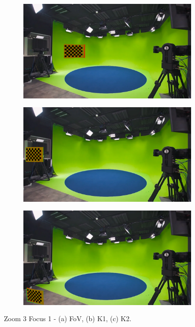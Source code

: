 \begin{figure}[h]
    \centering
    \begin{subfigure}[b]{0.45\textwidth}
        \includegraphics[width=\textwidth]{Images/08annex/results/5.2.png}
        \caption{}
        \label{fig:a2}
    \end{subfigure}
    \hfill
    \begin{subfigure}[b]{0.45\textwidth}
        \includegraphics[width=\textwidth]{Images/08annex/results/5.3.png}
        \caption{}
        \label{fig:b2}
    \end{subfigure}
    
    \vspace{0.5cm}
    
    \begin{subfigure}[b]{0.45\textwidth}
        \includegraphics[width=\textwidth]{Images/08annex/results/5.4.png}
        \caption{}
        \label{fig:c2}
    \end{subfigure}

    \caption{Zoom 3 Focus 1 - (a) FoV, (b) K1, (c) K2.}
    \label{fig:vir_fov_cal}
\end{figure}

